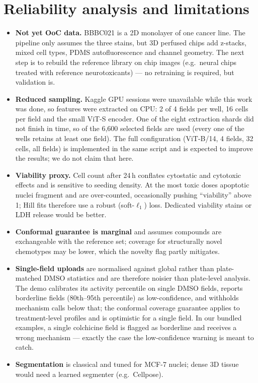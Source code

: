 \documentclass[11pt,a4paper]{article}
\begin{document}
\section{Reliability analysis and limitations}\label{sec:limits}
\begin{itemize}
\item \textbf{Not yet OoC data.} BBBC021 is a 2D monolayer of one cancer line. The pipeline only
assumes the three stains, but 3D perfused chips add z-stacks, mixed cell types, PDMS
autofluorescence and channel geometry. The next step is to rebuild the reference library on chip
images (e.g.\ neural chips treated with reference neurotoxicants) --- no retraining is required,
but validation is.
\item \textbf{Reduced sampling.} Kaggle GPU sessions were unavailable while this work was done,
so features were extracted on CPU: 2 of 4 fields per well, 16 cells per field and the small ViT-S
encoder. One of the eight extraction shards did not finish in time, so \NImages{} of the 6{,}600
selected fields are used (every one of the \NWells{} wells retains at least one field). The full
configuration (ViT-B/14, 4 fields, 32 cells, all fields) is implemented in the same script and
is expected to improve the results; we do not claim that here.
\item \textbf{Viability proxy.} Cell count after 24\,h conflates cytostatic and cytotoxic effects
and is sensitive to seeding density. At the most toxic doses apoptotic nuclei fragment and are
over-counted, occasionally pushing ``viability'' above 1; Hill fits therefore use a robust
(soft-$\ell_1$) loss. Dedicated viability stains or LDH release would be better.
\item \textbf{Conformal guarantee is marginal} and assumes compounds are exchangeable with the
reference set; coverage for structurally novel chemotypes may be lower, which the novelty flag
partly mitigates.
\item \textbf{Single-field uploads} are normalised against global rather than plate-matched DMSO
statistics and are therefore noisier than plate-level analysis. The demo calibrates its activity
percentile on single DMSO fields, reports borderline fields (80th--95th percentile) as
low-confidence, and withholds mechanism calls below that; the conformal coverage guarantee
applies to treatment-level profiles and is optimistic for a single field. In our bundled
examples, a single colchicine field is flagged as borderline and receives a wrong mechanism ---
exactly the case the low-confidence warning is meant to catch.
\item \textbf{Segmentation} is classical and tuned for MCF-7 nuclei; dense 3D tissue would need a
learned segmenter (e.g.\ Cellpose).
\end{itemize}
\end{document}
